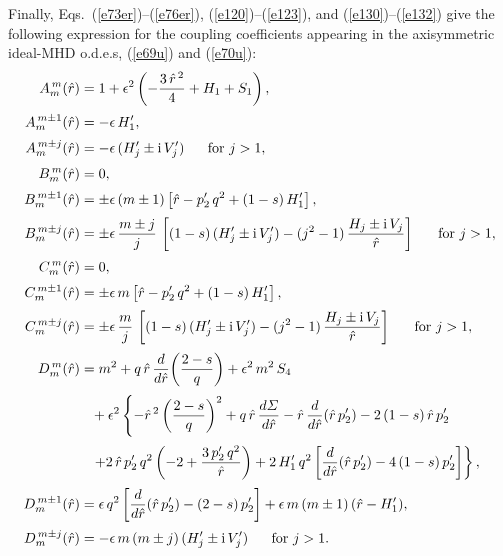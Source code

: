 \documentclass[12pt,prb,aps]{revtex4-1}
\begin{document}
Finally, Eqs.~(\ref{e73er})--(\ref{e76er}), (\ref{e120})--(\ref{e123}), and (\ref{e130})--(\ref{e132}) give the following expression for the coupling coefficients appearing
in the axisymmetric ideal-MHD o.d.e.s, (\ref{e69u}) and (\ref{e70u}): 
\begin{align}
A_m^{\,m}(\hat{r}) &= 1 + \epsilon^2\left(-\frac{3\,\hat{r}^{\,2}}{4} + H_1+S_1\right),\\[0.5ex]
A_m^{\,m\pm 1}(\hat{r}) &= - \epsilon\,H_1',\\[0.5ex]
A_m^{\,m\pm j}(\hat{r}) &= -\epsilon\,(H_j'\pm {\rm i}\, V_j')~~~~~\mbox{for $j>1$},\\[0.5ex]
B_m^{\,m}(\hat{r}) &= 0,\\[0.5ex]
B_m^{\,m\pm 1}(\hat{r}) &= \pm \epsilon\,(m\pm 1)\left[\hat{r}-p_2'\,q^2+(1-s)\,H_1'\right],\\[0.5ex]
B_m^{\,m\pm j}(\hat{r}) &= \pm\epsilon\,\frac{m\pm j}{j}\,\left[(1-s)\,(H_j'\pm {\rm i}\,V_j')- (j^2-1)\,\frac{H_j\pm {\rm i}\,V_j}{\hat{r}}\right]~~~~~\mbox{for $j>1$},\\[0.5ex]
C_m^{\,m}(\hat{r}) &= 0,\\[0.5ex]
C_m^{\,m\pm 1}(\hat{r}) &= \pm \epsilon\,m\left[\hat{r}-p_2'\,q^2+(1-s)\,H_1'\right],\\[0.5ex]
C_m^{\,m\pm j}(\hat{r}) &= \pm\epsilon\,\frac{m}{j}\,\left[(1-s)\,(H_j'\pm {\rm i}\,V_j')- (j^2-1)\,\frac{H_j\pm {\rm i}\,V_j}{\hat{r}}\right]~~~~~\mbox{for $j>1$},\\[0.5ex]
D_m^{\,m}(\hat{r}) &= m^2 + q\,\hat{r}\,\frac{d}{d\hat{r}}\!\left(\frac{2-s}{q}\right) +\epsilon^2\,m^2\,S_4\nonumber\\[0.5ex]
&\phantom{=}+\epsilon^2\left\{-\hat{r}^{\,2}\left(\frac{2-s}{q}\right)^2+q\,\hat{r}\,\frac{d{\mit\Sigma}}{d\hat{r}}- \hat{r}\,\frac{d}{d\hat{r}}(\hat{r}\,p_2') -2\,(1-s)\,\hat{r}\,p_2'
\right.\nonumber\\[0.5ex]
&\phantom{=}\left.+2\,\hat{r}\,p_2'\,q^2\left(-2 + \frac{3\,p_2'\,q^2}{\hat{r}}\right) + 2\,H_1'\,q^2\left[\frac{d}{d\hat{r}}(\hat{r}\,p_2')-4\,(1-s)\,p_2'\right]\right\},\\[0.5ex]
D_m^{\,m\pm 1}(\hat{r}) &=\epsilon\,q^2\left[\frac{d}{d\hat{r}}(\hat{r}\,p_2') - (2-s)\,p_2'\right] + \epsilon\,m\,(m\pm 1)\,(\hat{r}-H_1'),\\[0.5ex]
D_m^{\,m\pm j}(\hat{r}) &= -\epsilon\,m\,(m\pm j)\,(H_j'\pm {\rm i}\,V_j')~~~~~\mbox{for $j>1$}.
\end{align}
\end{document}
